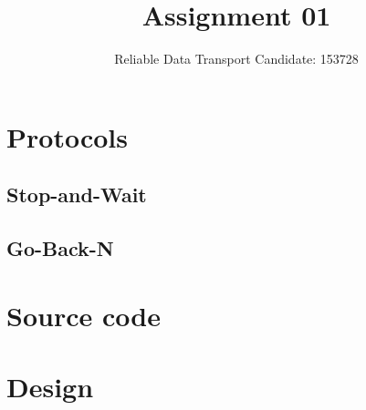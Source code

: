 \documentclass[a4paper]{article}
\title{\vspace{-5ex}Assignment 01}
\author{{Reliable Data Transport \hspace{1cm} Candidate: 153728}}
\date{}
\begin{document}
\maketitle
\vspace{-4ex}

\section{Protocols}

\subsection{Stop-and-Wait}

\subsection{Go-Back-N}

\section{Source code}

\section{Design}
\end{document}

